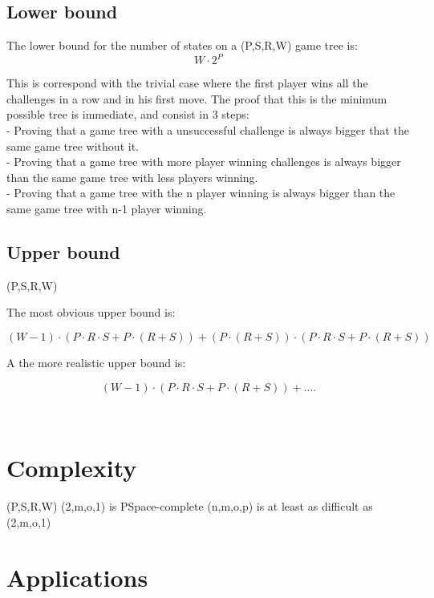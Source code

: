 \subsection{Lower bound}
The lower bound for the number of states on a \sr(P,S,R,W) game tree is: 
$$W\cdot2^P$$

This is correspond with the trivial case where the first player wins all the challenges in a row and in his first move. The proof that this is the minimum possible tree is immediate, and consist in 3 steps: \\

- Proving that a game tree with a unsuccessful challenge is always bigger that the same game tree without it.\\

- Proving that a game tree with more player winning challenges is always bigger than the same game tree with less players winning.\\

- Proving that a game tree with the n player winning is always bigger than the same game tree with n-1 player winning.\\


\subsection{Upper bound}
\sr(P,S,R,W) \newline

The most obvious upper bound is:

$$(W-1) \cdot (P \cdot R \cdot S + P \cdot (R+S)) + (P \cdot (R+S)) \cdot (P \cdot R \cdot S + P \cdot (R+S))$$

A the more realistic upper bound is:

$$(W-1) \cdot (P \cdot R \cdot S + P \cdot (R+S)) + ....$$

\ \\

\section{Complexity}
\sr(P,S,R,W) \newline
\sr(2,m,o,1) is PSpace-complete \newline
\sr(n,m,o,p) is at least as difficult as \sr(2,m,o,1) \newline

\section{Applications}


